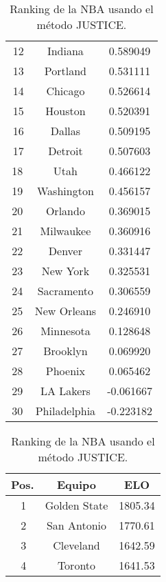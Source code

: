 \documentclass[a4paper]{article}
\newcommand{\bigfatgreen}{\begin{tikzpicture}[x=0.5pt,y=0.6pt,yscale=-.5,xscale=.5]
\draw  [fill=ForestGreen!70,fill opacity=1] (100,123.22) -- (113.25,113) -- (126.5,123.22) -- (119.88,123.22) -- (119.88,138.54) -- (106.63,138.54) -- (106.63,123.22) -- cycle ;
\end{tikzpicture}}
\newcommand{\bigfatred}{\begin{tikzpicture}[x=0.5pt,y=0.6pt,yscale=-.5,xscale=.5, rotate= 180]
\draw  [fill=red!70,fill opacity=1] (100,123.22) -- (113.25,113) -- (126.5,123.22) -- (119.88,123.22) -- (119.88,138.54) -- (106.63,138.54) -- (106.63,123.22) -- cycle ;
\end{tikzpicture}}
\begin{document}
\begin{table}[h]
{\begin{subtable}{0.33\textwidth}
\begin{tabular}{|c|c|c|}
                \bigfatred\,12 & Indiana & 0.589049 \\
                \bigfatred\,13 & Portland & 0.531111 \\
                \bigfatgreen\,14 & Chicago & 0.526614 \\
                \bigfatred\,15 & Houston & 0.520391 \\
                \bigfatred\,16 & Dallas & 0.509195 \\
                \bigfatred\,17 & Detroit & 0.507603 \\
                18 & Utah & 0.466122 \\
                19 & Washington & 0.456157 \\
                20 & Orlando & 0.369015  \\
                21 & Milwaukee & 0.360916 \\
                22 & Denver & 0.331447 \\
                23 & New York & 0.325531 \\
                24 & Sacramento & 0.306559 \\
                25 & New Orleans & 0.246910 \\
                26 & Minnesota & 0.128648 \\
                27 & Brooklyn & 0.069920 \\
                28 & Phoenix & 0.065462  \\
                29 & LA Lakers & -0.061667 \\
                30 & Philadelphia & -0.223182 \\
                \hline
            \end{tabular}
            \caption{Ranking de la NBA usando el m\'etodo JUSTICE.}
            \label{subtab:NBA_JUSTICE}
        \end{subtable}%
        \begin{subtable}{0.33\textwidth}
            \centering
            \begin{tabular}{|c|c|c|}
                \hline
            	Pos. & Equipo & ELO\\
            	\hline
                \bigfatgreen\,1 & Golden State & 1805.34 \\
                \bigfatgreen\,2 & San Antonio & 1770.61 \\
                \bigfatred\,3 & Cleveland & 1642.59 \\
                \bigfatred\,4 & Toronto & 1641.53 \\

\end{tabular}
\end{subtable}}
\end{table}
\end{document}
